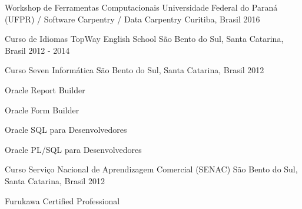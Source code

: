 

\begin{cventries}

  \cventry
	{Workshop de Ferramentas Computacionais} %
	{Universidade Federal do Paraná (UFPR) / Software Carpentry / Data Carpentry} %
	{Curitiba, Brasil} %
	{2016} %
	{
	}

  \cventry
    {Curso de Idiomas} %
    {TopWay English School} %
    {São Bento do Sul, Santa Catarina, Brasil} %
    {2012 - 2014} %
    {
    }

  \cventry
    {Curso} %
    {Seven Informática} %
    {São Bento do Sul, Santa Catarina, Brasil} %
    {2012} %
    {
      \begin{cvitems} %
        \item {Oracle Report Builder}
        \item {Oracle Form Builder}
        \item {Oracle SQL para Desenvolvedores}
        \item {Oracle PL/SQL para Desenvolvedores}
      \end{cvitems}
    }

  \cventry
	{Curso} %
	{Serviço Nacional de Aprendizagem Comercial (SENAC)} %
	{São Bento do Sul, Santa Catarina, Brasil} %
	{2012} %
	{
	    \begin{cvitems} %
	      \item {Furukawa Certified Professional}
	    \end{cvitems}
	}

\end{cventries}
